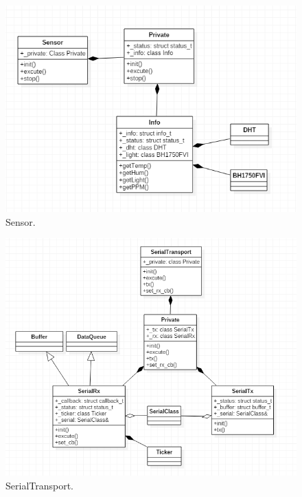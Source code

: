 \documentclass[a4paper,12pt,oneside]{article}
\begin{document}
\begin{itemize}
\begin{itemize}
\begin{figure}[H]
\centering
\begin{center}
\includegraphics[scale=.85]{hinh/class_sensor.PNG}
\end{center}
\caption{Sensor.}
\end{figure}

\begin{figure}[H]
\centering
\includegraphics[scale=.65]{hinh/class_serialtransport.PNG}
\caption{SerialTransport.}
\end{figure}


\end{itemize}
\end{itemize}
\end{document}
